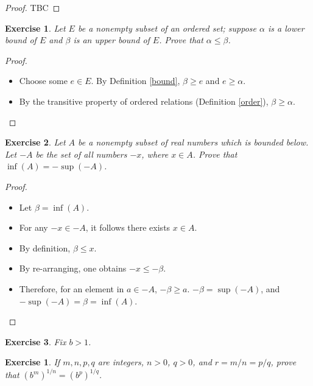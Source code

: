 \documentclass[12pt]{article}
\newtheorem{exercise}{Exercise}[section]
\newtheorem{subexercise}{Exercise}[exercise]
\begin{document}
\begin{proof}
    TBC
\end{proof}

\begin{exercise}
    Let $E$ be a nonempty subset of an ordered set; suppose $\alpha$ is a lower bound of $E$ and $\beta$ is an upper bound of $E$. Prove that $\alpha \leq \beta$.
\end{exercise}

\begin{proof}
    \begin{itemize}
        \item Choose some $e \in E$. By Definition \ref{bound}, $\beta \geq e$ and $e \geq \alpha$.
        \item By the transitive property of ordered relations (Definition \ref{order}), $\beta \geq \alpha$.
    \end{itemize}
\end{proof}

\begin{exercise}
    Let $A$ be a nonempty subset of real numbers which is bounded below. Let $-A$ be the set of all numbers $-x$, where $x \in A$. Prove that $\inf(A) = -\sup(-A)$.
\end{exercise}

\begin{proof}
    \begin{itemize}
        \item Let $\beta = \inf(A)$.
        \item For any $-x \in -A$, it follows there exists $x \in A$.
        \item By definition, $\beta \leq x$.
        \item By re-arranging, one obtains $-x \leq -\beta$.
        \item Therefore, for an element in $a \in -A$, $-\beta \geq a$. $-\beta = \sup(-A)$, and $-\sup(-A) = \beta = \inf(A)$.
    \end{itemize}
\end{proof}

\begin{exercise}
    Fix $b > 1$.
\end{exercise}

\begin{subexercise}
    If $m, n, p, q$ are integers, $n>0$, $q>0$, and $r = m/n = p/q$, prove that $(b^m)^{1/n} = (b^p)^{1/q}$.
\end{subexercise}
\end{document}
